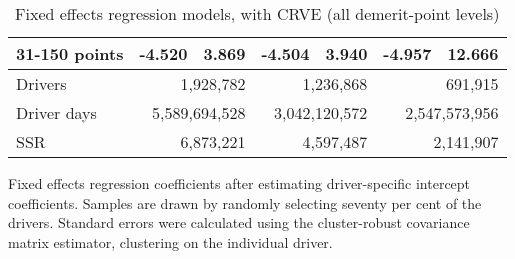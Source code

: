 \begin{table}
\begin{tabular}{l r r r r r r}
31-150 points  & -4.520  &  3.869  & -4.504  &  3.940  & -4.957  & 12.666   \\ 
 

\hline 
 

Drivers 
 & \multicolumn{2}{r}{1,928,782}  & \multicolumn{2}{r}{1,236,868}  & \multicolumn{2}{r}{691,915}   \\ 
 

Driver days 
 & \multicolumn{2}{r}{5,589,694,528}  & \multicolumn{2}{r}{3,042,120,572}  & \multicolumn{2}{r}{2,547,573,956}   \\ 
 

SSR 
 & \multicolumn{2}{r}{6,873,221}  & \multicolumn{2}{r}{4,597,487}  & \multicolumn{2}{r}{2,141,907}   \\ 
 

\hline 
 
\end{tabular} 
\caption{Fixed effects regression models, with CRVE (all demerit-point levels)} 
Fixed effects regression coefficients after estimating driver-specific intercept coefficients. 
Samples are drawn by randomly selecting seventy per cent of the drivers. 
Standard errors were calculated using the cluster-robust covariance matrix estimator, 
clustering on the individual driver. 
\label{tab:FE_regs_CRVE_all_pts} 
\end{table} 
 
